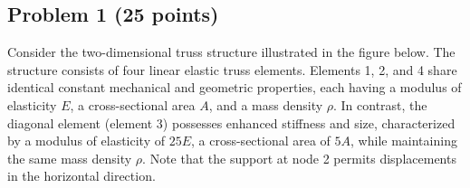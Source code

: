 \documentclass[12pt]{article}
\begin{document}
\noindent
\begin{center}



\end{center}




\newpage




\subsection*{Problem 1 {\small (25 points)}}
Consider the two-dimensional truss structure illustrated in the figure below. The structure consists of four linear elastic truss elements. Elements 1, 2, and 4 share identical constant mechanical and geometric properties, each having a modulus of elasticity $E$, a cross-sectional area $A$, and a mass density $\rho$. In contrast, the diagonal element (element 3) possesses enhanced stiffness and size, characterized by a modulus of elasticity of $25E$, a cross-sectional area of $5A$, while maintaining the same mass density $\rho$. Note that the support at node 2 permits displacements in the horizontal direction.
\end{document}
